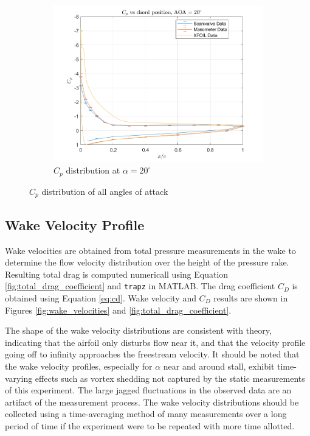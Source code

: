 \documentclass[runningheads]{llncs}
\begin{document}
\begin{figure}[H]
\begin{subfigure}[b]{0.3\textwidth}
        \includegraphics[width=\textwidth]{figures/AOA20.png}
        \caption{$C_p$ distribution at $\alpha = 20^\circ$}
        \label{fig:cp_20}
    \end{subfigure}
    \caption{$C_p$ distribution of all angles of attack}
\end{figure}


\subsection{Wake Velocity Profile}

\noindent
Wake velocities are obtained from total pressure measurements in the wake to determine the flow velocity distribution over the height of the pressure rake. Resulting total drag is computed numericall using Equation \ref{fig:total_drag_coefficient} and \verb|trapz| in MATLAB. The drag coefficient $C_D$ is obtained using Equation \ref{eq:cd}. Wake velocity and $C_D$ results are shown in Figures \ref{fig:wake_velocities} and \ref{fig:total_drag_coefficient}.\newline

\noindent
The shape of the wake velocity distributions are consistent with theory, indicating that the airfoil only disturbs flow near it, and that the velocity profile going off to infinity approaches the freestream velocity. It should be noted that the wake velocity profiles, especially for $\alpha$ near and around stall, exhibit time-varying effects such as vortex shedding not captured by the static measurements of this experiment. The large jagged fluctuations in the observed data are an artifact of the measurement process. The wake velocity distributions should be collected using a time-averaging method of many measurements over a long period of time if the experiment were to be repeated with more time allotted.\newline
\end{document}
